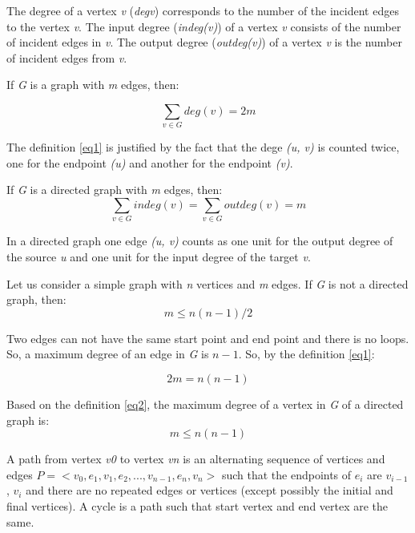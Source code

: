 \documentclass[a4paper]{article}
\begin{document}
    The degree of a vertex \emph{v} (\emph{deg{v}}) corresponds to
    the number of the incident edges to the vertex \emph{v}.
    The input degree (\emph{indeg(v)}) of a vertex \emph{v} consists
    of the number of incident edges in \emph{v}.
    The output degree (\emph{outdeg(v)}) of a vertex \emph{v} is the
    number of incident edges from \emph{v}.

    If \emph{G} is a graph with \emph{m} edges, then:



    \begin{equation} \label{eq1}
        \sum_{v \in G} deg(v) = 2m
    \end{equation}

    The definition \ref{eq1} is justified by the fact that the dege
    \emph{(u, v)} is counted twice, one for the endpoint \emph{(u)} and
    another for the endpoint \emph{(v)}.

    If \emph{G} is a directed graph with \emph{m} edges, then:
    \begin{equation} \label{eq2}
        \sum_{v \in G} indeg(v) = \sum_{v \in G} outdeg(v) = m
    \end{equation}

    In a directed graph one edge \emph{(u, v)} counts as one unit
    for the output degree of the source \emph{u} and one unit for
    the input degree of the target \emph{v}.

    Let us consider a simple graph with \emph{n} vertices and \emph{m}
    edges. If \emph{G} is not a directed graph, then:
    \begin{equation} \label{eq3}
        m \le n(n - 1) / 2
    \end{equation}

    Two edges can not have the same start point and end point and there
    is no loops. So, a maximum degree of an edge in \emph{G} is $n - 1$.
    So, by the definition \ref{eq1}:

    \begin{equation} \label{eq4}
        2m = n(n - 1)
    \end{equation}

    Based on the definition \ref{eq2}, the maximum degree of a vertex in \emph{G}
    of a directed graph is:
    \begin{equation}
        m \le n(n-1)
    \end{equation}



    A path from vertex \emph{v0} to vertex \emph{vn} is an alternating sequence of
    vertices and edges $ P =< v_0, e_1, v_1, e_2, ..., v_{n-1}, e_n, v_n > $
    such that the endpoints of $ e_i $ are $ v_{i-1} $, $ v_i $ and there are no
    repeated edges or vertices (except possibly the initial and final vertices).
    A cycle is a path such that start vertex and end vertex are the same.
\end{document}
